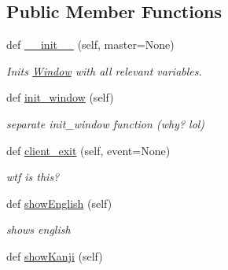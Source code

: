 \subsection*{Public Member Functions}
\begin{DoxyCompactItemize}
\item 
\mbox{\label{classkanji_1_1_window_a59d54032b3a731359a813918e8ebfcba}} 
def \mbox{\hyperlink{classkanji_1_1_window_a59d54032b3a731359a813918e8ebfcba}{\+\_\+\+\_\+init\+\_\+\+\_\+}} (self, master=None)
\begin{DoxyCompactList}\small\item\em Inits \mbox{\hyperlink{classkanji_1_1_window}{Window}} with all relevant variables. \end{DoxyCompactList}\item 
\mbox{\label{classkanji_1_1_window_a9a9ef4bb63106855c3c2eeb219d5a1e2}} 
def \mbox{\hyperlink{classkanji_1_1_window_a9a9ef4bb63106855c3c2eeb219d5a1e2}{init\+\_\+window}} (self)
\begin{DoxyCompactList}\small\item\em separate init\+\_\+window function (why? lol) \end{DoxyCompactList}\item 
\mbox{\label{classkanji_1_1_window_a4115c28ae4398d08e40a6a64f1a514dd}} 
def \mbox{\hyperlink{classkanji_1_1_window_a4115c28ae4398d08e40a6a64f1a514dd}{client\+\_\+exit}} (self, event=None)
\begin{DoxyCompactList}\small\item\em wtf is this? \end{DoxyCompactList}\item 
\mbox{\label{classkanji_1_1_window_af1a5d08812943793218b0495ace92b8f}} 
def \mbox{\hyperlink{classkanji_1_1_window_af1a5d08812943793218b0495ace92b8f}{show\+English}} (self)
\begin{DoxyCompactList}\small\item\em shows english \end{DoxyCompactList}\item 
\mbox{\label{classkanji_1_1_window_a37cb56aa0d0e37851a81ff0571e87059}} 
def \mbox{\hyperlink{classkanji_1_1_window_a37cb56aa0d0e37851a81ff0571e87059}{show\+Kanji}} (self)

\end{DoxyCompactItemize}
